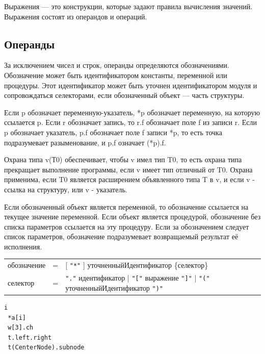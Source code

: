 \documentclass[a4paper,12pt]{article}
\newcommand{\lit}[1]{\texttt{"#1"}}
\begin{document}
    Выражения — это конструкции, которые задают правила вычисления значений. Выражения состоят из операндов и операций.

    \subsection*{Операнды}

    За исключением чисел и строк, операнды определяются обозначениями. Обозначение может быть идентификатором константы, переменной или процедуры. Этот идентификатор может быть уточнен идентификатором модуля и сопровождаться селекторами, если обозначенный объект — часть структуры.

    Если p обозначает переменную-указатель, *p  обозначает переменную, на которую ссылается p. Если r обозначает запись, то r.f обозначает поле f из записи r. Если p обозначает указатель, p.f обозначает поле f записи *p, то есть точка подразумевает разыменование, и p.f означает (*p).f.

    Охрана типа v(Т0) обеспечивает, чтобы v имел тип T0, то есть охрана типа прекращает выполнение программы, если v имеет тип отличный от T0. Охрана применима, если T0 является расширением объявленного типа T в v, и если v - ссылка на структуру, или v - указатель.

    Если обозначенный объект является переменной, то обозначение ссылается на текущее значение переменной. Если объект является процедурой, обозначение без списка параметров ссылается на эту процедуру. Если за обозначением следует список параметров, обозначение подразумевает возвращаемый результат её исполнения.

    \begin{center}
        \begin{tabular}{l c l}
            обозначение & = & [ \lit{*} ] уточненныйИдентификатор \{селектор\} \\
            селектор & = & \lit{.} идентификатор | \lit{[} выражение \lit{]} | \lit{(} уточненныйИдентификатор \lit{)}
        \end{tabular}
    \end{center}


    \begin{center}
        \begin{minipage}[t]{0.5\textwidth}
            \begin{lstlisting}[style=obouldstyle]
 i
 *a[i]
 w[3].ch
 t.left.right
 t(CenterNode).subnode
            \end{lstlisting}
        \end{minipage}
    \end{center}
\end{document}
